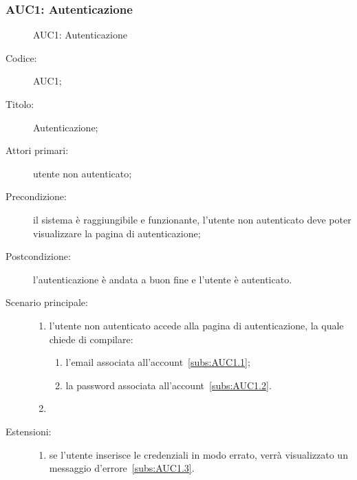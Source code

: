 \documentclass[../../../analisi-dei-requisiti.tex]{subfiles}
\begin{document}
\subsubsection{AUC1: Autenticazione}%
\label{subs:AUC1}

\begin{figure}[H]
  \centering
  \caption{AUC1: Autenticazione}%
  \label{fig:auc1}
\end{figure}

\begin{description}
  \item[Codice:] AUC1;
  \item[Titolo:] Autenticazione;
  \item[Attori primari:] utente non autenticato;
  \item[Precondizione:] il sistema è raggiungibile e funzionante, l'utente non autenticato deve poter visualizzare la pagina di autenticazione;
  \item[Postcondizione:] l'autenticazione è andata a buon fine e l'utente è autenticato.
  \item[Scenario principale:]
  \begin{enumerate}
    \item l'utente non autenticato accede alla pagina di autenticazione, la quale chiede di compilare:
    \begin{enumerate}
      \item l’email associata all’account~\ref{subs:AUC1.1};
      \item la password associata all’account~\ref{subs:AUC1.2}.
    \end{enumerate}
    \item
  \end{enumerate}
  \item[Estensioni:]
  \begin{enumerate}
    \item se l'utente inserisce le credenziali in modo errato, verrà visualizzato un messaggio d'errore~\ref{subs:AUC1.3}.
  \end{enumerate}
\end{description}
\end{document}
